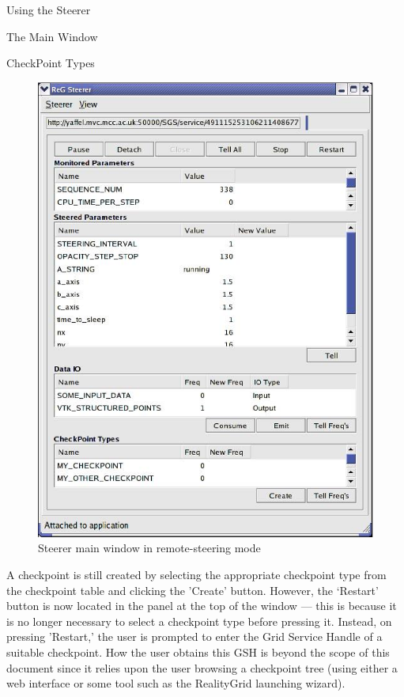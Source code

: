 \documentclass[a4paper,twoside]{article}
\begin{document}
\begin{section}{Using the Steerer}
\begin{subsection}{The Main Window}
\begin{subsubsection}{CheckPoint Types}
\begin{figure}
\centerline{\includegraphics{main_window_grid.eps}}
\caption{Steerer main window in remote-steering mode}
\label{fig:main_window_grid}
\end{figure}

A checkpoint is still created by selecting the appropriate checkpoint
type from the checkpoint table and clicking the 'Create' button.
However, the `Restart' button is now located in the panel at the top
of the window --- this is because it is no longer necessary to select a
checkpoint type before pressing it.  Instead, on pressing 'Restart,'
the user is prompted to enter the Grid Service Handle of a suitable
checkpoint.  How the user obtains this GSH is beyond the scope of this
document since it relies upon the user browsing a checkpoint tree
(using either a web interface or some tool such as the RealityGrid
launching wizard).

\end{subsubsection} %
\end{subsection} %


\end{section}
\end{document}
